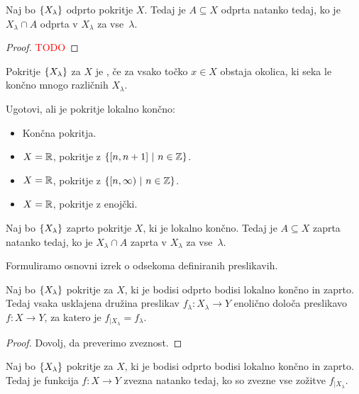 \begin{lema}
    Naj bo $\left\{X_\lambda\right\}$ odprto pokritje $X$. Tedaj je $A \subseteq X$ odprta natanko tedaj, ko je $X_\lambda \cap A$ odprta v $X_\lambda$ za vse~$\lambda$.
\end{lema}

\begin{proof}
    \textcolor{red}{TODO}
\end{proof}

\begin{definicija}
    Pokritje $\left\{X_\lambda\right\}$ za $X$ je , če za vsako točko $x \in X$ obstaja okolica, ki seka le končno mnogo različnih $X_\lambda$.
\end{definicija}

\begin{primer}
    Ugotovi, ali je pokritje lokalno končno:
    \begin{itemize}
        \item Končna pokritja.
        \item $X = \mathbb{R}$, pokritje z $\left\{[n, n+1] \ | \ n \in \mathbb{Z}\right\}$.
        \item $X = \mathbb{R}$, pokritje z $\left\{[n, \infty) \ | \ n \in \mathbb{Z}\right\}$.
        \item $X = \mathbb{R}$, pokritje z enojčki.
    \end{itemize}
\end{primer}

\begin{lema}
    Naj bo $\left\{X_\lambda\right\}$ zaprto pokritje $X$, ki je lokalno končno. Tedaj je $A \subseteq X$ zaprta natanko tedaj, ko je $X_\lambda \cap A$ zaprta v $X_\lambda$ za vse~$\lambda$.
\end{lema}

Formuliramo osnovni izrek o odsekoma definiranih preslikavih.
\begin{izrek}
    Naj bo $\left\{X_\lambda\right\}$ pokritje za $X$, ki je bodisi odprto bodisi lokalno končno in zaprto. Tedaj vsaka usklajena družina preslikav $f_\lambda: X_\lambda \to Y$ enolično določa preslikavo $f: X \to Y$, za katero je $f_{|X_\lambda} = f_\lambda$.
\end{izrek}

\begin{proof}
    Dovolj, da preverimo zveznost.
\end{proof}

\begin{posledica}
    Naj bo $\left\{X_\lambda\right\}$ pokritje za $X$, ki je bodisi odprto bodisi lokalno končno in zaprto. Tedaj je funkcija $f: X \to Y$ zvezna natanko tedaj, ko so zvezne vse zožitve $f_{|X_\lambda}$.
\end{posledica}

